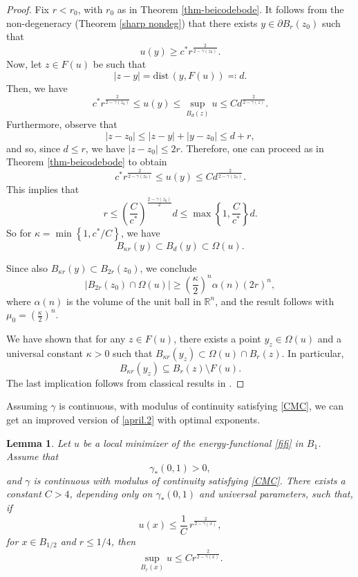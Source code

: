 \documentclass[reqno,11pt]{amsart}
\newtheorem{lemma}{Lemma}[section]
\newcommand\dist{\mathrm{dist}\,}
\newcommand{\R}{\mathbb R}
\newcommand{\1}{\mathds{1}}
\numberwithin{equation}{section}
\begin{document}
\begin{proof}
Fix $r < r_0$, with $r_0$ as in Theorem \ref{thm-beicodebode}. It follows from the non-degeneracy (Theorem \ref{sharp nondeg}) that there exists $y \in \partial B_r(z_0)$ such that
$$u (y) \geq c^\ast r^{\frac{2}{2-\gamma(z_0)}}.$$
Now, let $z \in F(u)$ be such that 
$$
    \left| z-y \right| = \dist (y, F(u)) \eqqcolon d.
$$
Then, we have
$$
    c^\ast r^{\frac{2}{2-\gamma(z_0)}} \leq u(y) \leq \sup_{B_d(z)} u \leq C d^{\frac{2}{2-\gamma(z)}}.
$$
Furthermore, observe that
$$
    |z-z_0| \leq |z-y| + |y-z_0| \leq d+r,
$$
and so, since $d \leq r$, we have $|z-z_0| \leq 2r$. Therefore, one can proceed as in Theorem \ref{thm-beicodebode} to obtain
$$
    c^\ast r^{\frac{2}{2-\gamma(z_0)}} \leq u(y) \leq Cd^{\frac{2}{2-\gamma(z_0)}}.
$$
This implies that 
$$
    r  \leq  \left(\frac{C}{c^\ast} \right)^{\frac{2-\gamma(z_0)}{2}}  d \leq  \max \left\{ 1, \frac{C}{c^\ast} \right\} d.
$$
So for $\kappa = \min \left\{ 1, c^\ast / C \right\}$, we have
$$
    B_{\kappa r}(y) \subset B_d(y) \subset \Omega(u).
$$

Since also $B_{\kappa r}(y) \subset B_{2r}(z_0)$, we conclude
$$
    |B_{2r}(z_0)\cap \Omega(u)| \geq \left(\frac{\kappa}{2} \right)^n \alpha(n) (2r)^n,
$$
where $\alpha(n)$ is the volume of the unit ball in $\R^n$, and the result follows with $\mu_0 = \left(\frac{\kappa}{2} \right)^n$. 

We have shown that for any $z \in F(u)$, there exists a point $y_z \in \Omega(u)$ and a universal constant $\kappa > 0$ such that 
$B_{\kappa r}(y_z) \subset \Omega(u) \cap B_r(z)$. In particular,
$$
    B_{\kappa r}(y_z) \subseteq B_r(z) \setminus F(u).
$$
The last implication follows from classical results in \cite{Z}.
\end{proof}

Assuming $\gamma$ is continuous, with modulus of continuity satisfying \eqref{CMC}, we can get an improved version of \eqref{april.2} with optimal exponents.

\begin{lemma}\label{april} 
Let $u$ be a local minimizer of the energy-functional \eqref{fifi} in $B_1$. Assume that
$$
    \gamma_\ast (0,1)>0,
$$
and $\gamma$ is continuous with modulus of continuity satisfying \eqref{CMC}. There exists a constant $C>4$, depending only on $\gamma_\ast (0,1)$ and universal parameters, such that, if 
\begin{equation*}
    u(x) \le \frac{1}{C} \, r^{\frac{2}{2-\gamma(x)}}, 
\end{equation*}
for $x\in B_{1/2}$ and $r \leq 1/4$, then
\begin{equation}\label{conclusion flat lemma}
    \sup_{B_r(x)} u \leq C r^{\frac{2}{2-\gamma(x)}}.
\end{equation}  
\end{lemma} 
\end{document}

